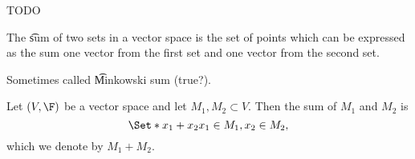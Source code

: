 

TODO


The \t{sum} of two sets in a vector space is the set of points which can be expressed as the sum one vector from the first set and one vector from the second set.

Sometimes called \t{Minkowski sum} (true?).


Let $(V, \F)$ be a vector space and let $M_1, M_2 \subset V$.
Then the sum of $M_1$ and $M_2$ is
$$
  \Set*{x_1 + x_2}{x_1 \in M_1, x_2 \in M_2},
$$
which we denote by $M_1 + M_2$.
